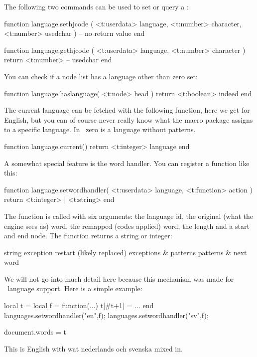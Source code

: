 The following two commands can be used to set or query a \type {\hjcode}:

\starttyping [option=LUA]
function language.sethjcode (
    <t:userdata> language,
    <t:number>   character,
    <t:number>   usedchar
)
    -- no return value
end

function language.gethjcode (
    <t:userdata> language,
    <t:number>   character
)
    return <t:number> -- usedchar
end
\stoptyping

You can check if a node list has a language other than zero set:

\starttyping [option=LUA]
function language.haslanguage( <t:node> head )
    return <t:boolean> indeed
end
\stoptyping

The current language can be fetched with the following function, here we get
 for English, but you can of course never
really know what the macro package assigns to a specific language. In \CONTEXT\
zero is a language without patterns.

\starttyping [option=LUA]
function language.current()
    return <t:integer> language
end
\stoptyping

A somewhat special feature is the word handler. You can register a
function like this:

\starttyping [option=LUA]
function language.setwordhandler(
    <t:userdata> language,
    <t:function> action
)
    return <t:integer> | <t:string>
end
\stoptyping

The function is called with six arguments: the language id, the original (what
the engine sees as) word, the remapped (codes applied) word, the length and a
start and end node. The function returns a string or integer:

\starttabulate[|c|l|]
\FL
\NC string \NC exception \NC \NR
\ML
{}      \NC restart (likely replaced) \NC \NR
{}      \NC exceptions & patterns     \NC \NR
{}      \NC patterns & next word      \NC \NR
\LL
\stoptabulate

We will not go into much detail here because this mechanism was made for
\CONTEXT\ language support. Here is a simple example:

\startbuffer
\startluacode
local t = { }
local f = function(...) t[#t+1] = { ... } end
languages.setwordhandler("en",f);
languages.setwordhandler("sv",f);

document.words = t
\stopluacode

\setbox\scratchbox\vbox\bgroup
    This is English with
    {\nl wat nederlands}
    {\sv och svenska}
    mixed in.
\egroup

